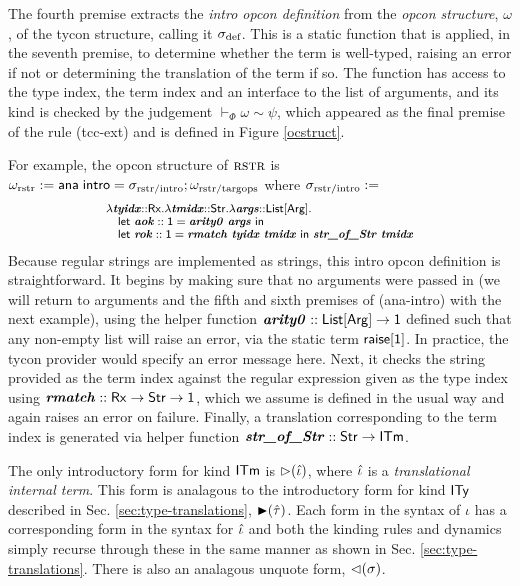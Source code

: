\documentclass[10pt,preprint]{sigplanconf}
\begin{document}
The fourth premise extracts the \emph{intro opcon definition} from the \emph{opcon structure}, $\omega$, of the tycon structure, calling it $\sigma_\text{def}$. This is a static function that is applied, in the seventh premise, to determine whether the term is well-typed, raising an error if not or determining the translation of the term if so. The function has access to the type index, the term index and an interface to the list of arguments, and its kind is checked by the  judgement $\vdash_\Phi \omega \sim \psi$, which appeared as the final premise of the rule (tcc-ext) and is defined in Figure \ref{ocstruct}. 

For example, the opcon structure of $\textsc{rstr}$ is  $\small\omega_\text{rstr} := \tcstructn{\stx{rstr/intro}}; \omega_\text{rstr/targops}$ where $\small\stx{rstr/intro}:=$
\[\small\begin{array}{l}
    \slam{\krx}{\svar{tyidx}}{\slam{\kstr}{\svar{tmidx}}{\slam{\kargs}{\svar{args}}{\\
\quad \keyw{let}~\svar{aok} :: \kunit = \svar{arity0}~\svar{args}~\keyw{in}~\\
\quad \keyw{let}~\svar{rok} :: \kunit = \svar{rmatch}~\svar{tyidx}~\svar{tmidx}~\keyw{in}~\svar{str\_of\_Str}~\svar{tmidx}
}}}
\end{array}\]
Because regular strings are implemented as strings, this intro opcon definition is straightforward. It begins by making sure that no arguments were passed in (we will return to arguments and the fifth and sixth premises of (ana-intro) with the next example), using the helper function $\svar{arity0} :: \kargs \rightarrow \kunit$ defined such that any non-empty list will raise an error, via the static term ${\sf raise}[{\sf 1}]$. In practice, the tycon provider would specify an error message here. 
Next, it checks the string provided as the term index against the regular expression given as the type index using ${\textbf{\textit{rmatch}}} :: {\sf Rx} \rightarrow {\sf Str} \rightarrow {\sf 1}$, which we assume is defined in the usual way and again raises an error on failure. Finally, a {translation} corresponding to the term index is generated via  helper function $\svar{str\_of\_Str} :: \keyw{Str} \rightarrow \kitm$.%

The only introductory form for kind ${\sf ITm}$ is ${\rhd}(\hat{\iota})$, where $\hat{\iota}$ is a \emph{translational internal term}. This form is analagous to the introductory form for kind ${\sf ITy}$ described in Sec. \ref{sec:type-translations}, ${\blacktriangleright}(\hat{\tau})$. Each form in the syntax of $\iota$ has a corresponding form in the syntax for $\hat{\iota}$ and both the kinding rules and dynamics simply recurse through these in the same manner as shown in Sec. \ref{sec:type-translations}. There is also an analagous unquote form, ${\lhd}(\sigma)$. %
\end{document}
